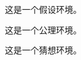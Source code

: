 \documentclass[lang = zh , final , oneside , openany , titlepage , zihao = -4 , linespread = 1.3 , baselineskip = false , cjk-font = windows , text-font = newtx , math-font = newtx]{sjtureport}
\begin{document}
\begin{assumption}
    这是一个假设环境。
\end{assumption}

\begin{axiom}
    这是一个公理环境。
\end{axiom}

\begin{conjecture}
    这是一个猜想环境。
\end{conjecture}

\nocite{*}

\end{document}
